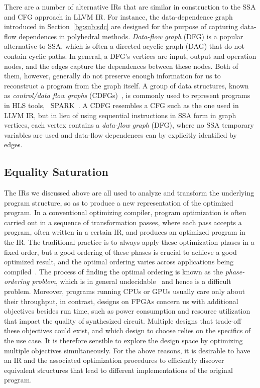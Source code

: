 There are a number of alternative IRs that are similar in construction to
the SSA and CFG approach in LLVM IR\@.  For instance, the data-dependence
graph~\cite{rau94} introduced in Section~\ref{bg:sub:sdc} are designed
for the purpose of capturing data-flow dependences in polyhedral methods.
\emph{Data-flow graph} (DFG) is a popular alternative to SSA, which is often
a directed acyclic graph (DAG) that do not contain cyclic paths.  In general,
a DFG's vertices are input, output and operation nodes, and the edges capture
the dependences between these nodes.  Both of them, however, generally do
not preserve enough information for us to reconstruct a program from the
graph itself.  A group of data structures, known as \emph{control/data flow
graphs} (CDFGs)~\cite{orailoglu86}, is commonly used to represent programs in
HLS tools, \eg~SPARK~\cite{gupta04}.  A CDFG resembles a CFG such as the one
used in LLVM IR, but in lieu of using sequential instructions in SSA form in
graph vertices, each vertex contains a \emph{data-flow graph} (DFG), where no
SSA temporary variables are used and data-flow dependences can by explicitly
identified by edges.


\subsection{Equality Saturation}
\label{bg:sub:equality_saturation}

The IRs we discussed above are all used to analyze and transform the underlying
program structure, so as to produce a new representation of the optimized
program.  In a conventional optimizing compiler, program optimization is
often carried out in a sequence of transformation passes, where each pass
accepts a program, often written in a certain IR, and produces an optimized
program in the IR\@.  The traditional practice is to always apply these
optimization phases in a fixed order, but a good ordering of these phases
is crucial to achieve a good optimized result, and the optimal ordering
varies across applications being compiled~\cite{almagor04}.  The process of
finding the optimal ordering is known as the \emph{phase-ordering problem},
which is in general undecidable~\cite{touati06} and hence is a difficult
problem.  Moreover, programs running CPUs or GPUs usually care only about
their throughput, in contrast, designs on FPGAs concern us with additional
objectives besides run time, such as power consumption and resource utilization
that impact the quality of synthesized circuit.  Multiple designs that
trade-off these objectives could exist, and which design to choose relies
on the specifics of the use case.  It is therefore sensible to explore the
design space by optimizing multiple objectives simultaneously.  For the
above reasons, it is desirable to have an IR and the associated optimization
procedures to efficiently discover equivalent structures that lead to different
implementations of the original program.

